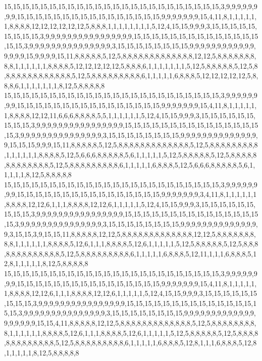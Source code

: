 15,15,15,15,15,15,15,15,15,15,15,15,15,15,15,15,15,15,15,15,15,15,15,15,3,9,9,9,9,9,9,9,9,15,15,15,15,15,15,15,15,15,15,15,15,15,15,15,15,9,9,9,9,9,9,9,15,4,11,8,1,1,1,1,1,1,8,8,8,8,12,12,12,12,12,12,5,8,8,8,1,1,1,1,1,1,1,1,5,12,4,15,15,9,9,9,3,15,15,15,15,15,15,15,15,15,3,9,9,9,9,9,9,9,9,9,9,9,9,9,9,9,9,15,15,15,15,15,15,15,15,15,15,15,15,15,15,15,15,3,9,9,9,9,9,9,9,9,9,9,9,9,9,9,9,3,15,15,15,15,15,15,15,15,9,9,9,9,9,9,9,9,9,9,9,9,9,9,9,9,15,9,9,9,9,15,11,8,8,8,8,8,5,12,5,8,8,8,8,8,8,8,8,8,8,8,8,8,12,12,5,8,8,8,8,8,8,8,8,8,1,1,1,1,1,1,8,8,8,8,5,12,12,12,12,12,5,8,8,8,6,1,1,1,1,1,1,1,5,12,5,8,8,8,8,8,5,12,5,8,8,8,8,8,8,8,8,8,8,8,8,8,5,12,5,8,8,8,8,8,8,8,8,8,6,1,1,1,1,1,6,8,8,8,5,12,12,12,12,12,5,8,8,8,6,1,1,1,1,1,1,1,8,12,5,8,8,8,8,8
15,15,15,15,15,15,15,15,15,15,15,15,15,15,15,15,15,15,15,15,15,15,15,15,3,9,9,9,9,9,9,9,9,15,15,15,15,15,15,15,15,15,15,15,15,15,15,15,15,9,9,9,9,9,9,9,15,4,11,8,1,1,1,1,1,1,8,8,8,8,12,12,11,6,6,6,8,8,8,8,5,5,1,1,1,1,1,1,5,12,4,15,15,9,9,9,3,15,15,15,15,15,15,15,15,15,3,9,9,9,9,9,9,9,9,9,9,9,9,9,9,9,9,15,15,15,15,15,15,15,15,15,15,15,15,15,15,15,15,3,9,9,9,9,9,9,9,9,9,9,9,9,9,9,9,3,15,15,15,15,15,15,15,15,9,9,9,9,9,9,9,9,9,9,9,9,9,9,9,15,15,15,9,9,9,15,11,8,8,8,8,8,5,12,5,8,8,8,8,8,8,8,8,8,8,8,8,8,5,12,5,8,8,8,8,8,8,8,8,8,1,1,1,1,1,1,8,8,8,8,5,12,5,6,6,6,8,8,8,8,8,5,6,1,1,1,1,1,5,12,5,8,8,8,8,8,5,12,5,8,8,8,8,8,8,8,8,8,8,8,8,8,5,12,5,8,8,8,8,8,8,8,8,8,6,1,1,1,1,1,6,8,8,8,5,12,5,6,6,6,8,8,8,8,8,5,6,1,1,1,1,1,8,12,5,8,8,8,8,8
15,15,15,15,15,15,15,15,15,15,15,15,15,15,15,15,15,15,15,15,15,15,15,15,3,9,9,9,9,9,9,9,9,15,15,15,15,15,15,15,15,15,15,15,15,15,15,15,15,9,9,9,9,9,9,9,3,4,11,8,1,1,1,1,1,1,8,8,8,8,12,12,6,1,1,1,8,8,8,8,12,12,6,1,1,1,1,1,5,12,4,15,15,9,9,9,3,15,15,15,15,15,15,15,15,15,3,9,9,9,9,9,9,9,9,9,9,9,9,9,9,9,9,15,15,15,15,15,15,15,15,15,15,15,15,15,15,15,15,3,9,9,9,9,9,9,9,9,9,9,9,9,9,9,9,3,15,15,15,15,15,15,15,15,9,9,9,9,9,9,9,9,9,9,9,9,9,9,9,3,15,15,3,9,15,15,11,8,8,8,8,8,12,12,5,8,8,8,8,8,8,8,8,8,8,8,8,8,12,12,5,8,8,8,8,8,8,8,8,8,1,1,1,1,1,1,8,8,8,8,5,12,6,1,1,1,8,8,8,8,5,12,6,1,1,1,1,1,5,12,5,8,8,8,8,8,5,12,5,8,8,8,8,8,8,8,8,8,8,8,8,8,5,12,5,8,8,8,8,8,8,8,8,8,6,1,1,1,1,1,6,8,8,8,5,12,11,1,1,1,6,8,8,8,5,12,8,1,1,1,1,1,8,12,5,8,8,8,8,8
15,15,15,15,15,15,15,15,15,15,15,15,15,15,15,15,15,15,15,15,15,15,15,15,3,9,9,9,9,9,9,9,9,15,15,15,15,15,15,15,15,15,15,15,15,15,15,15,15,9,9,9,9,9,9,9,15,4,11,8,1,1,1,1,1,1,8,8,8,8,12,12,6,1,1,1,8,8,8,8,12,12,6,1,1,1,1,1,5,12,4,15,15,9,9,9,3,15,15,15,15,15,15,15,15,15,3,9,9,9,9,9,9,9,9,9,9,9,9,9,9,9,9,15,15,15,15,15,15,15,15,15,15,15,15,15,15,15,15,3,9,9,9,9,9,9,9,9,9,9,9,9,9,9,9,3,15,15,15,15,15,15,15,15,9,9,9,9,9,9,9,9,9,9,9,9,9,9,9,9,9,9,9,15,15,4,11,8,8,8,8,8,12,12,5,8,8,8,8,8,8,8,8,8,8,8,8,8,5,12,5,8,8,8,8,8,8,8,8,8,1,1,1,1,1,1,8,8,8,8,5,12,6,1,1,1,8,8,8,8,5,12,6,1,1,1,1,1,5,12,5,8,8,8,8,8,5,12,5,8,8,8,8,8,8,8,8,8,8,8,8,8,5,12,5,8,8,8,8,8,8,8,8,8,6,1,1,1,1,1,6,8,8,8,5,12,8,1,1,1,6,8,8,8,5,12,8,1,1,1,1,1,8,12,5,8,8,8,8,8
